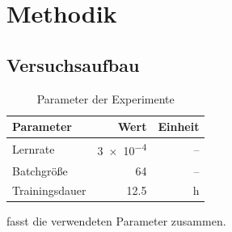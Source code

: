 \chapter{Methodik}
\label{ch:methodik}

\section{Versuchsaufbau}
\begin{table}[htbp]
  \centering
  \caption{Parameter der Experimente}
  \label{tab:parameter}
  \begin{tabular}{lrr}
    \toprule
    Parameter      & Wert           & Einheit \\
    \midrule
    Lernrate       & \num{3e-4}     & -- \\
    Batchgröße     & \num{64}       & -- \\
    Trainingsdauer & \num{12.5}     & \si{\hour} \\
    \bottomrule
  \end{tabular}
\end{table}

 fasst die verwendeten Parameter zusammen.
